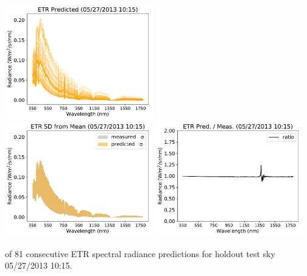 \begin{center}
\includegraphics[width=0.48\textwidth]{img/05271015_predicted.pdf}\\
\vspace{0.2in}%
\includegraphics[width=0.48\textwidth]{img/05271015_std.pdf}
\includegraphics[width=0.48\textwidth]{img/05271015_ratio.pdf}
\end{center}

\clearpage
 of 81 consecutive ETR spectral radiance predictions for holdout test sky {05/27/2013 10:15}.\\%

